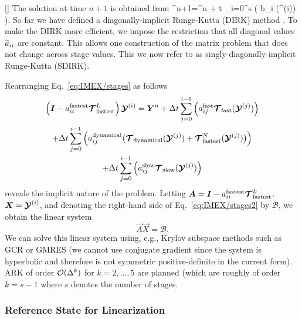 \documentclass{article}
\begin{document}
[]
The solution at time $n+1$ is obtained from
\be
\qvector^{n+1}=\qvector^n + \Delta t \sum_{i=0}^{s} \left( b_i (\qstage^{(i)}) \right).
\label{eq:IMEX/update}
\ee
So far we have defined a diagonally-implicit Runge-Kutta (DIRK) method \citep{alexander:1977,butcher:1981a,ascher:1997,boscarino:2009}.  To make the DIRK more efficient, we impose the restriction that all diagonal values $\widetilde{a}_{ii}$ are constant. This allows one construction of the matrix problem that does not change across stage values.  This we now refer to as singly-diagonally-implicit Runge-Kutta (SDIRK).

Rearranging Eq.\ \eqref{eq:IMEX/stages} as follows
\begin{multline}\label{eq:IMEX/stages2}
\left( \boldsymbol{{I}} - {a}^{\mathrm{fastest}}_{ii}\boldsymbol{{\mathcal{T}}}^L_{\mathrm{fastest}} \right)  \boldsymbol{{\mathcal{Y}}}^{(i)}  =  \boldsymbol{{Y}}^n + 
\Delta t \sum_{j=0}^{i-1} \left( {a}^{\mathrm{fast}}_{ij} \boldsymbol{{\mathcal{T}}}_{\mathrm{fast}}(\boldsymbol{{\mathcal{Y}}}^{(j)}) \right)   \\
+ \Delta t \sum_{j=0}^{i-1} \left( {a}^{\mathrm{dynamical}}_{ij} \bigl(\boldsymbol{{\mathcal{T}}}_{\mathrm{dynamical}}(\boldsymbol{{\mathcal{Y}}}^{(j)}) + \boldsymbol{{\mathcal{T}}}^N_\mathrm{fastest}(\boldsymbol{{\mathcal{Y}}}^{(j)})\bigr) \right) \\
+ \Delta t \sum_{j=0}^{i-1} \left( {a}^{\mathrm{slow}}_{ij} \boldsymbol{{\mathcal{T}}}_{\mathrm{slow}}(\boldsymbol{{\mathcal{Y}}}^{(j)}) \right) 
\end{multline}
reveals the implicit nature of the problem. Letting $\boldsymbol{{A}}=\boldsymbol{{I}} - {a}^{\mathrm{fastest}}_{ii} \boldsymbol{{\mathcal{T}}}^L_{\mathrm{fastest}}$, $\boldsymbol{{X}}=\boldsymbol{{\mathcal{Y}}}^{(i)}$, and denoting the right-hand side of Eq.~\eqref{eq:IMEX/stages2} by $\mathcal{B}$, we obtain the linear system 
\[
\vec{A} \vec{X} = \mathcal{B}.
\]
We can solve this linear system using, e.g., Krylov subspace methods such as GCR or GMRES (we cannot use conjugate gradient since the system is hyperbolic and therefore is not symmetric positive-definite in the current form). ARK of order $\mathcal{O}(\Delta ^k)$ for $k=2,\ldots,5$ are planned (which are roughly of order $k=s-1$ where $s$ denotes the number of stages.

\subsubsection{Reference State for Linearization}
\end{document}
